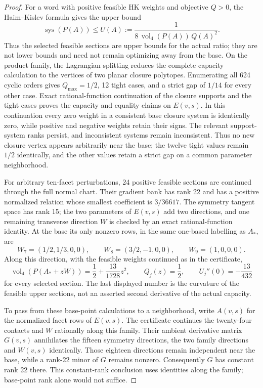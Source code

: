 \begin{proof}
For a word with positive feasible HK weights and objective $Q>0$, the
Haim--Kislev formula gives the upper bound
\[
 \operatorname{sys}(P(A))\leq
 U(A):=\frac{1}{8\,\operatorname{vol}_4(P(A))\,Q(A)^2}.
\]
Thus the selected feasible sections are upper bounds for the actual ratio;
they are not lower bounds and need not remain optimizing away from the base.
On the product family, the Lagrangian splitting reduces the complete capacity
calculation to the vertices of two planar closure polytopes. Enumerating all
624 cyclic orders gives $Q_{\max}=1/2$, 12 tight cases, and a strict gap
of $1/14$ for every other case. Exact rational-function continuation of the
closure supports and the tight cases proves the capacity and equality claims
on $E(v,s)$. In this continuation every zero weight in a consistent base
closure system is identically zero, while positive and negative weights
retain their signs. The relevant support-system ranks persist, and
inconsistent systems remain inconsistent. Thus no new closure vertex appears arbitrarily near
the base; the twelve tight values remain $1/2$ identically, and the other
values retain a strict gap on a common parameter neighborhood.

For arbitrary ten-facet perturbations, 24 positive feasible sections are
continued through the full normal chart. Their gradient bank has rank 22 and
has a positive normalized relation whose smallest coefficient is
$3/36617$. The symmetry tangent space has rank 15; the two parameters of
$E(v,s)$ add two directions, and one remaining transverse direction $W$
is checked by an exact rational-function identity. At the base its only
nonzero rows, in the same one-based labelling as $A_*$, are
\[
 W_7=(1/2,1/3,0,0),\qquad
 W_8=(3/2,-1,0,0),\qquad W_9=(1,0,0,0).
\]
Along this direction, with the feasible weights continued as in the
certificate,
\[
 \operatorname{vol}_4(P(A_*+zW))=\frac12+\frac{13}{1728}z^2,
 \qquad Q_j(z)=\frac12,
 \qquad U_j''(0)=-\frac{13}{432}
\]
for every selected section. The last displayed number is the curvature of
the feasible upper sections, not an asserted second derivative of the actual
capacity.

To pass from these base-point calculations to a neighborhood, write
$A(v,s)$ for the normalized facet rows of $E(v,s)$. The certificate
continues the twenty-four contacts and $W$ rationally along this family.
Their ambient derivative matrix $G(v,s)$ annihilates the fifteen symmetry
directions, the two family directions and $W(v,s)$ identically. Those
eighteen directions remain independent near the base, while a rank-22
minor of $G$ remains nonzero. Consequently $G$ has constant rank 22 there.
This constant-rank conclusion uses identities along the family; base-point
rank alone would not suffice.


\end{proof}
